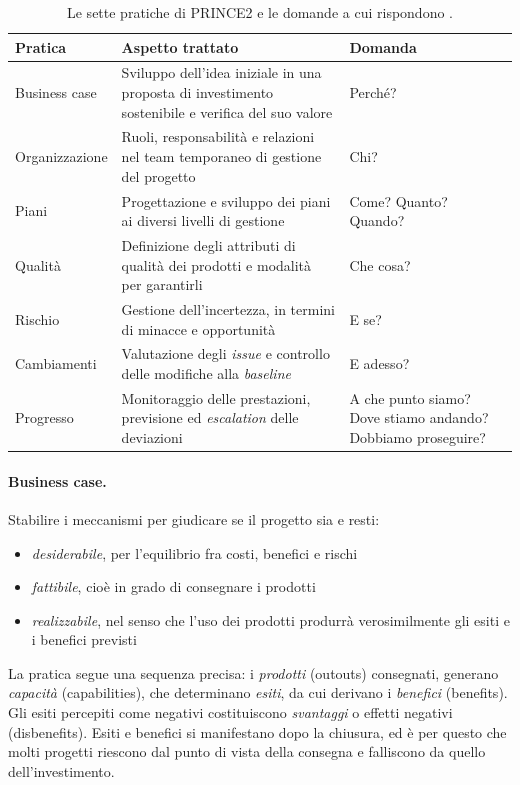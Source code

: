 \begin{table}[htbp]
\centering
\small
\caption{Le sette pratiche di PRINCE2 e le domande a cui rispondono \cite{prince27}.}
\label{tab:p2-pratiche}
\begin{tabularx}{\textwidth}{@{}l X >{\raggedright\arraybackslash}p{3.1cm}@{}}
\toprule
\textbf{Pratica} & \textbf{Aspetto trattato} & \textbf{Domanda} \\
\midrule
Business case & Sviluppo dell'idea iniziale in una proposta di investimento sostenibile e verifica del suo valore & Perch\'e? \\
Organizzazione & Ruoli, responsabilit\`a e relazioni nel team temporaneo di gestione del progetto & Chi? \\
Piani & Progettazione e sviluppo dei piani ai diversi livelli di gestione & Come? Quanto? Quando? \\
Qualit\`a & Definizione degli attributi di qualit\`a dei prodotti e modalit\`a per garantirli & Che cosa? \\
Rischio & Gestione dell'incertezza, in termini di minacce e opportunit\`a & E se? \\
Cambiamenti & Valutazione degli \emph{issue} e controllo delle modifiche alla \emph{baseline} & E adesso? \\
Progresso & Monitoraggio delle prestazioni, previsione ed \emph{escalation} delle deviazioni & A che punto siamo? Dove stiamo andando? Dobbiamo proseguire? \\
\bottomrule
\end{tabularx}
\end{table}
\newpage

\paragraph{Business case.} Stabilire i meccanismi per giudicare se il progetto
sia e resti:
\begin {itemize}
\item \emph{desiderabile}, per l'equilibrio fra costi, benefici e rischi
\item \emph{fattibile}, cio\`e in grado di consegnare i prodotti
\item \emph{realizzabile}, nel senso che l'uso dei prodotti produrr\`a
verosimilmente gli esiti e i benefici previsti
\end {itemize}
La pratica segue una sequenza precisa: i \emph{prodotti} (outouts) consegnati, generano
\emph{capacit\`a} (capabilities), che determinano \emph{esiti}, da cui derivano
i \emph{benefici} (benefits). Gli esiti percepiti come negativi costituiscono
\emph{svantaggi} o effetti negativi (disbenefits).
Esiti e benefici si manifestano dopo la chiusura, ed \`e per questo che molti
progetti riescono dal punto di vista della consegna e falliscono da quello
dell'investimento.

